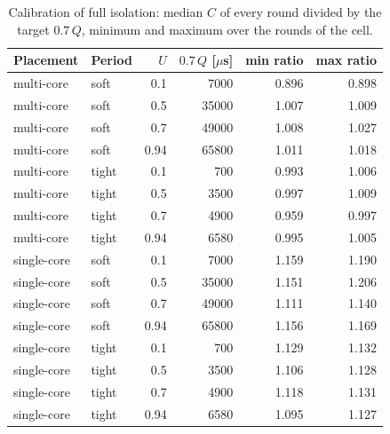 \begin{table}[ht]
\centering
\small
\begin{tabular}{llrrrr}
\toprule
Placement & Period & $U$ & $0.7\,Q$ [$\mu$s] & min ratio & max ratio \\
\midrule
multi-core & soft & 0.1 & 7000 & 0.896 & 0.898 \\
multi-core & soft & 0.5 & 35000 & 1.007 & 1.009 \\
multi-core & soft & 0.7 & 49000 & 1.008 & 1.027 \\
multi-core & soft & 0.94 & 65800 & 1.011 & 1.018 \\
multi-core & tight & 0.1 & 700 & 0.993 & 1.006 \\
multi-core & tight & 0.5 & 3500 & 0.997 & 1.009 \\
multi-core & tight & 0.7 & 4900 & 0.959 & 0.997 \\
multi-core & tight & 0.94 & 6580 & 0.995 & 1.005 \\
single-core & soft & 0.1 & 7000 & 1.159 & 1.190 \\
single-core & soft & 0.5 & 35000 & 1.151 & 1.206 \\
single-core & soft & 0.7 & 49000 & 1.111 & 1.140 \\
single-core & soft & 0.94 & 65800 & 1.156 & 1.169 \\
single-core & tight & 0.1 & 700 & 1.129 & 1.132 \\
single-core & tight & 0.5 & 3500 & 1.106 & 1.128 \\
single-core & tight & 0.7 & 4900 & 1.118 & 1.131 \\
single-core & tight & 0.94 & 6580 & 1.095 & 1.127 \\
\bottomrule
\end{tabular}
\caption{Calibration of full isolation: median $C$ of every round divided by the target $0.7\,Q$, minimum and maximum over the rounds of the cell.}
\label{tab:rq1-calibration}
\end{table}
